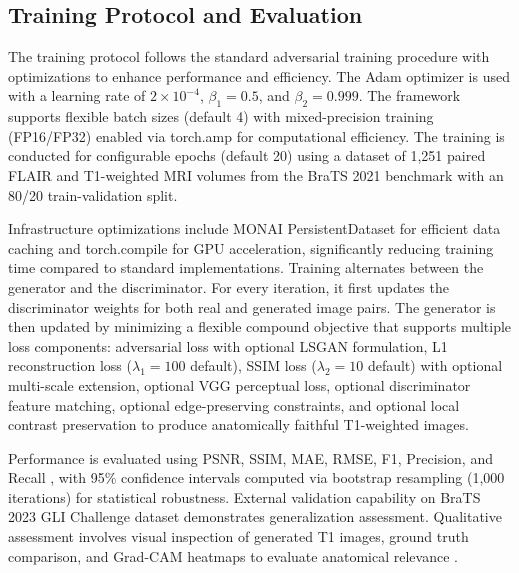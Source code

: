 \documentclass[runningheads]{llncs}
\begin{document}
\subsection{Training Protocol and Evaluation}

The training protocol follows the standard adversarial training procedure with optimizations to enhance performance and efficiency. The Adam optimizer is used with a learning rate of $2 \times 10^{-4}$, $\beta_1 = 0.5$, and $\beta_2 = 0.999$. The framework supports flexible batch sizes (default 4) with mixed-precision training (FP16/FP32) enabled via torch.amp for computational efficiency. The training is conducted for configurable epochs (default 20) using a dataset of 1,251 paired FLAIR and T1-weighted MRI volumes from the BraTS 2021 benchmark with an 80/20 train-validation split.

Infrastructure optimizations include MONAI PersistentDataset for efficient data caching and torch.compile for GPU acceleration, significantly reducing training time compared to standard implementations. Training alternates between the generator and the discriminator. For every iteration, it first updates the discriminator weights for both real and generated image pairs. The generator is then updated by minimizing a flexible compound objective that supports multiple loss components: adversarial loss with optional LSGAN formulation, L1 reconstruction loss ($\lambda_1 = 100$ default), SSIM loss ($\lambda_2 = 10$ default) with optional multi-scale extension, optional VGG perceptual loss, optional discriminator feature matching, optional edge-preserving constraints, and optional local contrast preservation to produce anatomically faithful T1-weighted images. 

Performance is evaluated using PSNR, SSIM, MAE, RMSE, F1, Precision, and Recall \cite{Wang2004,Zhou2002,Taha2015,Litjens2017}, with 95\% confidence intervals computed via bootstrap resampling (1,000 iterations) for statistical robustness. External validation capability on BraTS 2023 GLI Challenge dataset demonstrates generalization assessment. Qualitative assessment involves visual inspection of generated T1 images, ground truth comparison, and Grad-CAM heatmaps to evaluate anatomical relevance \cite{Selvaraju2017}.
\end{document}
